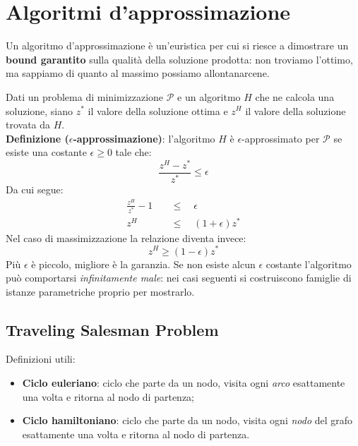 \section{Algoritmi d'approssimazione}
Un algoritmo d'approssimazione è un'euristica per cui si riesce a dimostrare un \textbf{bound garantito} sulla qualità della soluzione prodotta: non troviamo l'ottimo, ma sappiamo di quanto al massimo possiamo allontanarcene.

Dati un problema di minimizzazione $\mathcal{P}$ e un algoritmo $H$ che ne calcola una soluzione, siano $z^*$ il valore della soluzione ottima e $z^H$ il valore della soluzione trovata da $H$.\\

\textbf{Definizione ($\epsilon$-approssimazione)}: l'algoritmo $H$ è $\epsilon$-approssimato per $\mathcal{P}$ se esiste una costante $\epsilon \ge 0$ tale che:
\begin{equation*}
	\frac{z^H-z^*}{z^*}\le \epsilon
\end{equation*}
Da cui segue:
\begin{equation*}
	\begin{aligned}
		\frac{z^H}{z^*}-1 \quad & \le \quad \epsilon\\
		z^H \quad & \le \quad (1+\epsilon)z^*
	\end{aligned}
\end{equation*}
Nel caso di massimizzazione la relazione diventa invece:
\begin{equation*}
	z^H\ge (1-\epsilon)z^*
\end{equation*}
Più $\epsilon$ è piccolo, migliore è la garanzia. Se non esiste alcun $\epsilon$ costante l'algoritmo può comportarsi \textit{infinitamente male}: nei casi seguenti si costruiscono famiglie di istanze parametriche proprio per mostrarlo.

\subsection{Traveling Salesman Problem}
Definizioni utili:
\begin{itemize}
	\item \textbf{Ciclo euleriano}: ciclo che parte da un nodo, visita ogni \textit{arco} esattamente una volta e ritorna al nodo di partenza;
	\item \textbf{Ciclo hamiltoniano}: ciclo che parte da un nodo, visita ogni \textit{nodo} del grafo esattamente una volta e ritorna al nodo di partenza.
\end{itemize}

